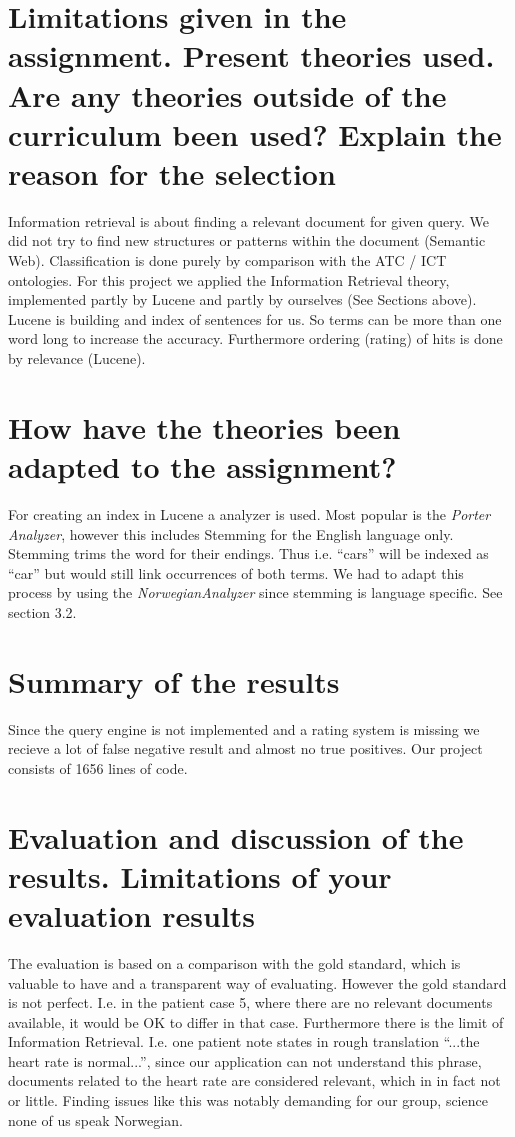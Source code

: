 \documentclass{article}
\begin{document}
\section{Limitations given in the assignment. Present theories used. Are any theories outside of the curriculum been used? Explain the reason for the selection}
Information retrieval is about finding a relevant document for given query. We did not try to find new structures or patterns within the document (Semantic Web). Classification is done purely by comparison with the ATC / ICT ontologies. For this project we applied the Information Retrieval theory, implemented partly by Lucene and partly by ourselves (See Sections above). Lucene is building and index of sentences for us. So terms can be more than one word long to increase the accuracy. Furthermore ordering (rating) of hits is done by relevance (Lucene). 
\section{How have the theories been adapted to the assignment?}
For creating an index in Lucene a analyzer is used. Most popular is the \textit{Porter Analyzer}, however this includes Stemming for the English language only. Stemming trims the word for their endings. Thus i.e. "`cars"' will be indexed as "`car"' but would still link occurrences of both terms. We had to adapt this process by using the \textit{NorwegianAnalyzer} since stemming is language specific. See section 3.2. 
\section{Summary of the results}
Since the query engine is not implemented and a rating system is missing we recieve a lot of false negative result and almost no true positives. Our project consists of 1656 lines of code.
\section{Evaluation and discussion of the results. Limitations of your evaluation results}
The evaluation is based on a comparison with the gold standard, which is valuable to have and a transparent way of evaluating. However the gold standard is not perfect. I.e. in the patient case 5, where there are no relevant documents available, it would be OK to differ in that case. Furthermore there is the limit of Information Retrieval. I.e. one patient note states in rough translation "`...the heart rate is normal..."', since our application can not understand this phrase, documents related to the heart rate are considered relevant, which in in fact not or little. Finding issues like this was notably demanding for our group, science none of us speak Norwegian. 
\end{document}

